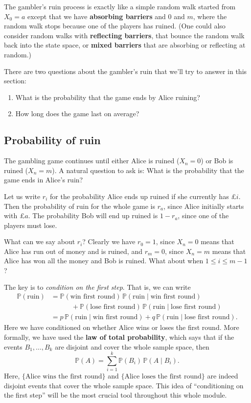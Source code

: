 \documentclass[
  a4paper,
]{article}
\providecommand{\tightlist}{%
  \setlength{\itemsep}{0pt}\setlength{\parskip}{0pt}}
\theoremstyle{definition}
\theoremstyle{definition}
\theoremstyle{definition}
\theoremstyle{remark}
\begin{document}
The gambler's ruin process is exactly like a simple random walk started from \(X_0 = a\) except that we have \textbf{absorbing barriers} and \(0\) and \(m\), where the random walk stops because one of the players has ruined. (One could also consider random walks with \textbf{reflecting barriers}, that bounce the random walk back into the state space, or \textbf{mixed barriers} that are absorbing or reflecting at random.)

There are two questions about the gambler's ruin that we'll try to answer in this section:

\begin{enumerate}
\def\labelenumi{\arabic{enumi}.}
\tightlist
\item
  What is the probability that the game ends by Alice ruining?
\item
  How long does the game last on average?
\end{enumerate}

\hypertarget{ruin-probability}{%
\subsection{Probability of ruin}\label{ruin-probability}}

The gambling game continues until either Alice is ruined (\(X_n = 0\)) or Bob is ruined (\(X_n = m\)). A natural question to ask is: What is the probability that the game ends in Alice's ruin?

Let us write \(r_i\) for the probability Alice ends up ruined if she currently has £\(i\). Then the probability of ruin for the whole game is \(r_a\), since Alice initially starts with £\(a\). The probability Bob will end up ruined is \(1 - r_a\), since one of the players must lose.

What can we say about \(r_i\)? Clearly we have \(r_0 = 1\), since \(X_n = 0\) means that Alice has run out of money and is ruined, and \(r_m = 0\), since \(X_n = m\) means that Alice has won all the money and Bob is ruined. What about when \(1 \leq i \leq m-1\)?

The key is to \emph{condition on the first step}. That is, we can write
\begin{align*}
\mathbb P(\text{ruin}) &= \mathbb P(\text{win first round}) \, \mathbb P(\text{ruin} \mid \text{win first round}) \\
&\qquad{}\quad {}+ \mathbb P(\text{lose first round}) \, \mathbb P(\text{ruin} \mid \text{lose first round}) \\
&= p\,\mathbb P(\text{ruin} \mid \text{win first round}) + q \,\mathbb P(\text{ruin} \mid \text{lose first round}) .
\end{align*}
Here we have conditioned on whether Alice wins or loses the first round. More formally, we have used the \textbf{law of total probability}, which says that if the events \(B_1, \dots, B_k\) are disjoint and cover the whole sample space, then
\[ \mathbb P(A) = \sum_{i=1}^k \mathbb P(B_i) \, \mathbb P(A \mid B_i) . \]
Here, \(\{\text{Alice wins the first round}\}\) and \(\{\text{Alice loses the first round}\}\) are indeed disjoint events that cover the whole sample space. This idea of ``conditioning on the first step'' will be the most crucial tool throughout this whole module.
\end{document}
